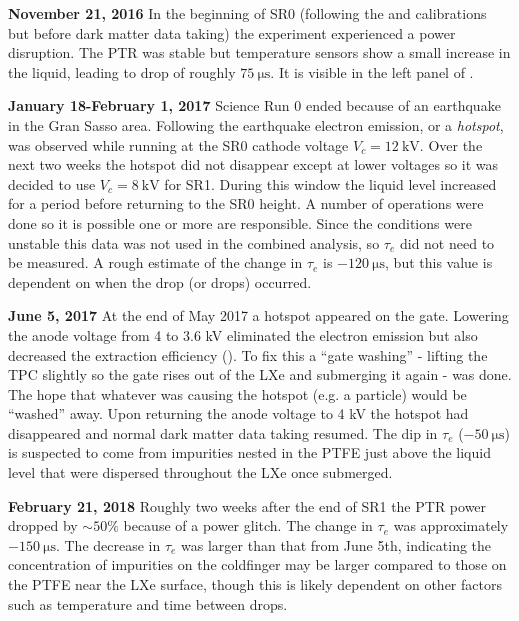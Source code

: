 \textbf{November 21, 2016}  In the beginning of SR0 (following the \ambe and \metakr calibrations but before dark matter data taking) the
experiment experienced a power disruption.  The PTR was stable but temperature sensors show a small increase in the
liquid, leading to drop of roughly $75\ \mathrm{\mu s}$.  It is visible in the left panel of
.

\textbf{January 18-February 1, 2017} Science Run 0 ended because of an earthquake in the Gran Sasso area.  Following the earthquake
electron emission, or a \textit{hotspot}, was observed while running at the SR0 cathode voltage $V_c = 12\ \mathrm{kV}$.  Over the next two
weeks the hotspot did not disappear except at lower voltages so it was decided to use $V_c = 8\ \mathrm{kV}$ for SR1.  During this window
the liquid level increased for a period before returning to the SR0 height.  A number of operations were done so it is possible one or more
are responsible.  Since the conditions were unstable this data was not used in the
combined analysis, so $\tau_e$ did not need to be measured.  A rough estimate of the change in $\tau_e$ is $-120\ \mathrm{\mu s}$, but this
value is dependent on when the drop (or drops) occurred.

\textbf{June 5, 2017}  At the end of May 2017 a hotspot appeared on the gate.  Lowering the anode voltage from 4 to 3.6 kV eliminated the
electron emission but also decreased the extraction efficiency ().  To fix this
a ``gate washing'' - lifting the TPC
slightly so the gate rises out of the LXe and submerging it again - was done.  The hope that whatever was causing the hotspot (e.g. a
particle) would be ``washed''
away.  Upon returning the anode voltage to 4 kV the hotspot had disappeared and normal dark matter data taking resumed.  The dip in
$\tau_e$ ($-50\ \mathrm{\mu s}$) is suspected to come from impurities nested in the PTFE just above the liquid level that were dispersed
throughout the LXe once submerged.

\textbf{February 21, 2018}  Roughly two weeks after the end of SR1 the PTR power dropped by ${\sim} 50\%$ because of a power glitch.  The
change in $\tau_e$ was approximately $-150\ \mathrm{\mu s}$.  The decrease in $\tau_e$ was larger than that from June 5th, indicating the
concentration of impurities on the
coldfinger may be larger compared to those on the PTFE near the LXe surface, though this is likely dependent on other factors such as
temperature and time between drops.

